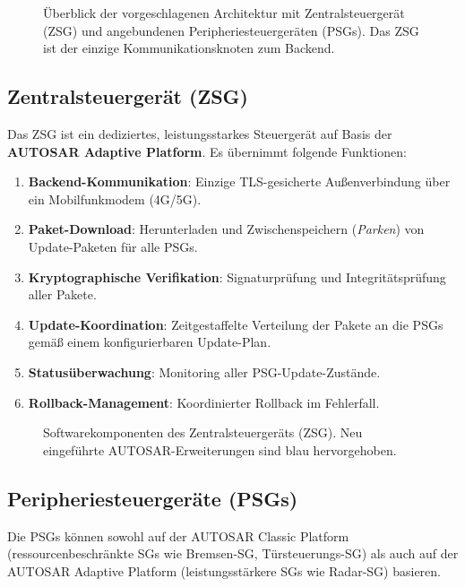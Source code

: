 ﻿\documentclass[12pt,a4paper,twoside]{article}
\begin{document}
\begin{figure}[h!]
  \centering
  
  \caption{Überblick der vorgeschlagenen Architektur mit Zentralsteuergerät
    (ZSG) und angebundenen Peripheriesteuergeräten (PSGs).
    Das ZSG ist der einzige Kommunikationsknoten zum Backend.}
  \label{fig:architecture_overview}
\end{figure}

\subsection{Zentralsteuergerät (ZSG)}
\label{subsec:zsg}

Das ZSG ist ein dediziertes, leistungsstarkes Steuergerät auf Basis der
\textbf{AUTOSAR Adaptive Platform}. Es übernimmt folgende Funktionen:

\begin{enumerate}
  \item \textbf{Backend-Kommunikation}: Einzige TLS-gesicherte
    Außenverbindung über ein Mobilfunkmodem (4G/5G).
  \item \textbf{Paket-Download}: Herunterladen und Zwischenspeichern
    (\textit{Parken}) von Update-Paketen für alle PSGs.
  \item \textbf{Kryptographische Verifikation}: Signaturprüfung und
    Integritätsprüfung aller Pakete.
  \item \textbf{Update-Koordination}: Zeitgestaffelte Verteilung der
    Pakete an die PSGs gemäß einem konfigurierbaren Update-Plan.
  \item \textbf{Statusüberwachung}: Monitoring aller PSG-Update-Zustände.
  \item \textbf{Rollback-Management}: Koordinierter Rollback im Fehlerfall.
\end{enumerate}

\begin{figure}[h!]
  \centering
  
  \caption{Softwarekomponenten des Zentralsteuergeräts (ZSG).
    Neu eingeführte AUTOSAR-Erweiterungen sind blau hervorgehoben.}
  \label{fig:zsg_components}
\end{figure}

\subsection{Peripheriesteuergeräte (PSGs)}
\label{subsec:psgs}

Die PSGs können sowohl auf der AUTOSAR Classic Platform (ressourcenbeschränkte
SGs wie Bremsen-SG, Türsteuerungs-SG) als auch auf der AUTOSAR Adaptive
Platform (leistungsstärkere SGs wie Radar-SG) basieren.
\end{document}
